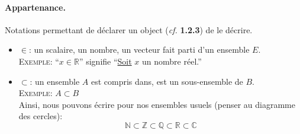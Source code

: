 \documentclass{article}
\newcommand{\Ex}{\textsc{Exemple}: }
\begin{document}
\paragraph{Appartenance.} 
Notations permettant de déclarer un object (\textit{cf.} \textbf{1.2.3})
de le décrire.

\begin{itemize}
    \item $\in$: un scalaire, un nombre, un vecteur fait parti d'un ensemble $E$. \\
        \Ex 
        \enquote{$x \in \mathbb{R}$} signifie 
        \enquote{\underline{Soit} $x$ un nombre réel.}
    \item $\subset$: un ensemble $A$ est compris dans, est un sous-ensemble de $B$. \\
        \Ex $A \subset B$ \\
        Ainsi, nous pouvons écrire pour nos ensembles usuels 
        (penser au diagramme des cercles): 
        \begin{equation}
            \mathbb{N} \subset \mathbb{Z} \subset \mathbb{Q} 
            \subset \mathbb{R} \subset \mathbb{C}
        \end{equation}
\end{itemize}
\end{document}
